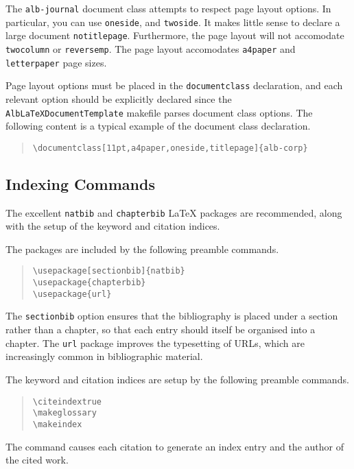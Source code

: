 \documentclass[11pt,a4paper,oneside,titlepage]{alb-corp}
\begin{document}
The \texttt{alb-journal} document class attempts to respect page layout
options.  In particular, you can use \texttt{oneside}, and
\texttt{twoside}.  It makes little sense to declare a large document
\texttt{notitlepage}.  Furthermore, the page layout will not accomodate
\texttt{twocolumn} or \texttt{reversemp}.  The page layout accomodates
\texttt{a4paper} and \texttt{letterpaper} page sizes.

Page layout options must be placed in the \texttt{documentclass}
declaration, and each relevant option should be explicitly declared
since the \texttt{AlbLaTeXDocumentTemplate} makefile parses document
class options.  The following content is a typical example of the
document class declaration.
\begin{quote}
\begin{verbatim}
\documentclass[11pt,a4paper,oneside,titlepage]{alb-corp}
\end{verbatim}
\end{quote}



\subsection{Indexing Commands}
\label{sec:alb-journal:index-comm}

The excellent \texttt{natbib} and \texttt{chapterbib} \LaTeX{} packages
are recommended, along with the setup of the keyword and citation
indices.

The packages are included by the following preamble commands.
\begin{quote}
\begin{verbatim}
\usepackage[sectionbib]{natbib}
\usepackage{chapterbib}
\usepackage{url}
\end{verbatim}
\end{quote}
The \texttt{sectionbib} option ensures that the bibliography is placed
under a section rather than a chapter, so that each entry should itself
be organised into a chapter.  The \texttt{url} package improves the
typesetting of URLs, which are increasingly common in bibliographic
material.

The keyword and citation indices are setup by the following preamble
commands.
\begin{quote}
\begin{verbatim}
\citeindextrue
\makeglossary
\makeindex
\end{verbatim}
\end{quote}
The  command causes each citation to generate
an index entry and the author of the cited work.
\end{document}
